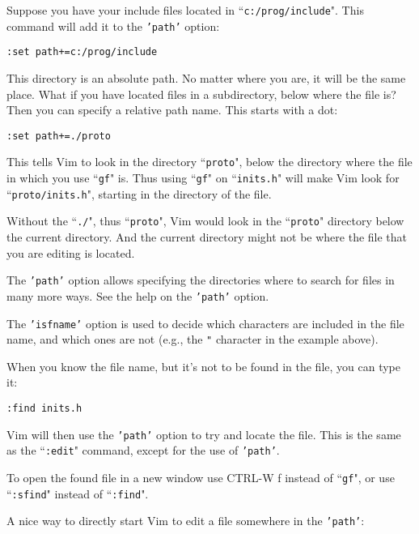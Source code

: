 Suppose you have your include files located in ``\texttt{c:/prog/include}".
This command will add it to the \texttt{'path'} option:

\begin{Verbatim}[samepage=true]
 :set path+=c:/prog/include
\end{Verbatim}

This directory is an absolute path.
No matter where you are, it will be the same place.
What if you have located files in a subdirectory, below where the file is?  Then you can specify a relative path name.
This starts with a dot:

\begin{Verbatim}[samepage=true]
 :set path+=./proto
\end{Verbatim}

This tells Vim to look in the directory ``\texttt{proto}", below the directory where the file in which you use ``\texttt{gf}" is.
Thus using ``\texttt{gf}" on ``\texttt{inits.h}" will make Vim look for ``\texttt{proto/inits.h}", starting in the directory of the file.

Without the ``\texttt{./}", thus ``\texttt{proto}", Vim would look in the ``\texttt{proto}" directory below the current directory.
And the current directory might not be where the file that you are editing is located.

The \texttt{'path'} option allows specifying the directories where to search for files in many more ways.
See the help on the \texttt{'path'} option.

The \texttt{'isfname'} option is used to decide which characters are included in the file name, and which ones are not (e.g., the \texttt{"} character in the example above).

When you know the file name, but it's not to be found in the file, you can type it:

\begin{Verbatim}[samepage=true]
 :find inits.h
\end{Verbatim}

Vim will then use the \texttt{'path'} option to try and locate the file.
This is the same as the ``\texttt{:edit}" command, except for the use of \texttt{'path'}.

To open the found file in a new window use CTRL-W f instead of ``\texttt{gf}", or use ``\texttt{:sfind}" instead of ``\texttt{:find}".

A nice way to directly start Vim to edit a file somewhere in the \texttt{'path'}:

